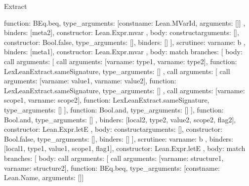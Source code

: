 \begin{lexlean}{Extract}
\begin{toolingmodule}
{{{{{{{                    function: BEq.beq,
                    type_arguments: [const{name: Lean.MVarId, arguments: []}]
                  },
                  binders: [meta2],
                  constructor: Lean.Expr.mvar
                },
                {
                  body: construct{arguments: [], constructor: Bool.false, type_arguments: []},
                  binders: []
                }
              ],
              scrutinee: var{name: b}
            },
            binders: [meta1],
            constructor: Lean.Expr.mvar
          },
          {
            body: match{
              branches: [
                {
                  body: call{
                    arguments: [
                      call{
                        arguments: [var{name: type1}, var{name: type2}],
                        function: LexLeanExtract.sameSignature,
                        type_arguments: []
                      },
                      call{
                        arguments: [
                          call{
                            arguments: [var{name: value1}, var{name: value2}],
                            function: LexLeanExtract.sameSignature,
                            type_arguments: []
                          },
                          call{
                            arguments: [var{name: scope1}, var{name: scope2}],
                            function: LexLeanExtract.sameSignature,
                            type_arguments: []
                          }
                        ],
                        function: Bool.and,
                        type_arguments: []
                      }
                    ],
                    function: Bool.and,
                    type_arguments: []
                  },
                  binders: [local2, type2, value2, scope2, flag2],
                  constructor: Lean.Expr.letE
                },
                {
                  body: construct{arguments: [], constructor: Bool.false, type_arguments: []},
                  binders: []
                }
              ],
              scrutinee: var{name: b}
            },
            binders: [local1, type1, value1, scope1, flag1],
            constructor: Lean.Expr.letE
          },
          {
            body: match{
              branches: [
                {
                  body: call{
                    arguments: [
                      call{
                        arguments: [var{name: structure1}, var{name: structure2}],
                        function: BEq.beq,
                        type_arguments: [const{name: Lean.Name, arguments: []}]
}}}}}}}}
\end{toolingmodule}
\end{lexlean}

